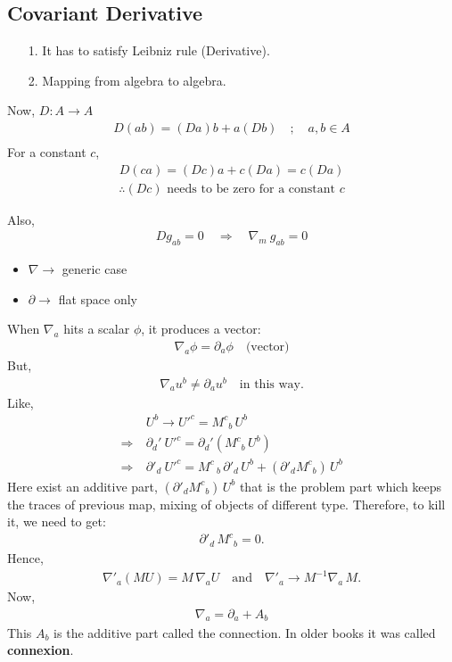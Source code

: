 \documentclass[14pt]{article} %
\begin{document}
\subsection{Covariant Derivative}

\begin{itemize}
    \item[1.] It has to satisfy Leibniz rule (Derivative).
    \item[2.] Mapping from algebra to algebra.
\end{itemize}
Now, $D : A \rightarrow A$
\begin{align*}
D(ab) = (Da)b + a(Db) \quad; \quad a, b \in A \\
\end{align*}
For a constant $c$,
\begin{align*}
D(ca) = (Dc)a + c(Da) = c(Da)
\end{align*}
\begin{align*}
    \therefore (Dc) \text{ needs to be zero for a constant } c
\end{align*}

Also,
\begin{align*}
    D g_{ab} = 0 \quad \Rightarrow \quad \nabla_m~ g_{ab} = 0
\end{align*}

\begin{itemize}
    \item $\nabla \rightarrow$ generic case
    \item $\partial \rightarrow$ flat space only
\end{itemize}

When $\nabla_a$ hits a scalar $\phi$, it produces a vector:
\begin{align*}
    \nabla_a \phi = \partial_a \phi \quad \text{(vector)}
\end{align*}
But,
\begin{align*}
    \nabla_a u^b \ne \partial_a u^b \quad \text{in this way.}
\end{align*}
Like,
\begin{align*}
& U^b \rightarrow U'^c = M^c{}_b \, U^b \\
\Rightarrow ~& \partial_d'~U'^c = \partial_d' (M^c{}_b \, U^b) \\
\Rightarrow ~& \partial'_d~U'^c = M^c\,_b \,\partial'_d \,U^b + (\partial'_d M^c{}_b)\, U^b
\end{align*}
Here exist an additive part, $(\partial'_d M^c{}_b)\, U^b$ that is the problem part which keeps the traces of previous map, mixing of objects of different type. Therefore, to kill it, we need to get:
\begin{align*}
\partial'_d\,M^c{}_b = 0.
\end{align*}
Hence,
\begin{align*}
\nabla'_a (M U) = M \,\nabla_a U \quad \text{and} \quad \nabla'_a \rightarrow M^{-1} \nabla_a \, M.
\end{align*}
Now,
\begin{align*}
\nabla_a = \partial_a + A_b
\end{align*}
This $A_b$ is the additive part called the connection. In older books it was called \textbf{connexion}.
\end{document}
